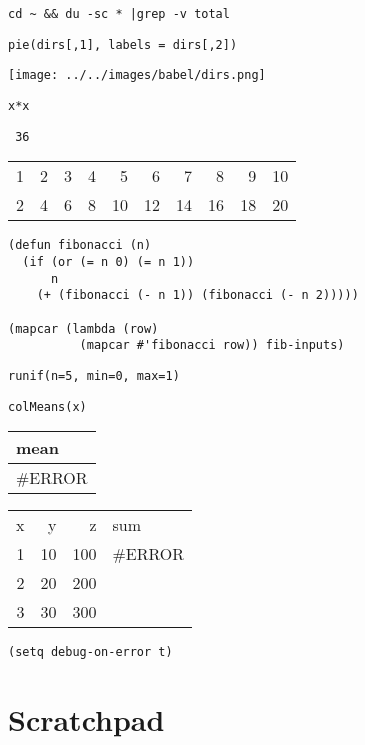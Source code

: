 \documentclass[11pt]{article}
\begin{document}
\begin{verbatim}
cd ~ && du -sc * |grep -v total
\end{verbatim}



\begin{verbatim}
pie(dirs[,1], labels = dirs[,2])
\end{verbatim}

\texttt{[image: ../../images/babel/dirs.png]}


\begin{verbatim}
x*x
\end{verbatim}



\begin{verbatim}
 36
\end{verbatim}


\begin{center}
\begin{tabular}{rrrrrrrrrr}
 1  &  2  &  3  &  4  &   5  &   6  &   7  &   8  &   9  &  10  \\
 2  &  4  &  6  &  8  &  10  &  12  &  14  &  16  &  18  &  20  \\
\end{tabular}
\end{center}




\begin{verbatim}
(defun fibonacci (n)
  (if (or (= n 0) (= n 1))
      n
    (+ (fibonacci (- n 1)) (fibonacci (- n 2)))))

(mapcar (lambda (row)
          (mapcar #'fibonacci row)) fib-inputs)
\end{verbatim}


\begin{verbatim}
runif(n=5, min=0, max=1)
\end{verbatim}


\begin{verbatim}
colMeans(x)
\end{verbatim}


\begin{center}
\begin{tabular}{l}
 mean     \\
\hline
 \#ERROR  \\
\end{tabular}
\end{center}





\begin{center}
\begin{tabular}{rrrl}
 x  &   y  &    z  &  sum      \\
 1  &  10  &  100  &  \#ERROR  \\
 2  &  20  &  200  &           \\
 3  &  30  &  300  &           \\
\end{tabular}
\end{center}




\begin{verbatim}
(setq debug-on-error t)
\end{verbatim}
\section{Scratchpad}
\label{sec-3}
\end{document}
